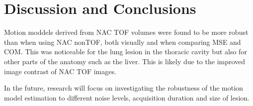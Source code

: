 \documentclass{IEEEtran}
\begin{document}
\vspace{-0.2cm}

\section*{Discussion and Conclusions}
Motion moddels derived from NAC TOF volumes were found to be more robust than when using NAC nonTOF, both visually and when comparing MSE and COM. This was noticeable for the lung lesion in the thoracic cavity but also for other parts of the anatomy such as the liver. This is likely due to the improved image contrast of NAC TOF images.

In the future, research will focus on investigating the robustness of the motion model estimation to different noise levels, acquisition duration and size of lesion.

\vspace{-0.2cm}
\AtNextBibliography{\small}
\printbibliography
\vspace{-0.2cm}
\end{document}
